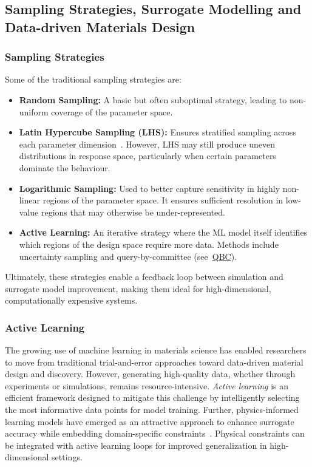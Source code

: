 \documentclass[class=scrbook, crop=false]{standalone}
\begin{document}
\subsection{Sampling Strategies, Surrogate Modelling and Data-driven Materials Design}

\subsubsection{Sampling Strategies}
\label{Subsubsection::Sampling_strategies}

Some of the traditional sampling strategies are:

\begin{itemize}
	\item \textbf{Random Sampling:} A basic but often suboptimal strategy, leading to non-uniform coverage of the parameter space. 
	
	\item \textbf{Latin Hypercube Sampling (LHS):} Ensures stratified sampling across each parameter dimension~\cite{mckay1979lhs}. However, LHS may still produce uneven distributions in response space, particularly when certain parameters dominate the behaviour.
	
	\item \textbf{Logarithmic Sampling:} Used to better capture sensitivity in highly non-linear regions of the parameter space. It ensures sufficient resolution in low-value regions that may otherwise be under-represented.
	
	\item \textbf{Active Learning:} An iterative strategy where the ML model itself identifies which regions of the design space require more data. Methods include uncertainty sampling and query-by-committee (see~\hyperlink{QBC}{QBC}).
\end{itemize}

Ultimately, these strategies enable a feedback loop between simulation and surrogate model improvement, making them ideal for high-dimensional, computationally expensive systems.


\subsubsection{Active Learning}

The growing use of machine learning in materials science has enabled researchers to move from traditional trial-and-error approaches toward data-driven material design and discovery. However, generating high-quality data, whether through experiments or simulations, remains resource-intensive. \textit{Active learning} is an efficient framework designed to mitigate this challenge by intelligently selecting the most informative data points for model training. Further, physics-informed learning models have emerged as an attractive approach to enhance surrogate accuracy while embedding domain-specific constraints~\cite{zhu2019physics, karniadakis2021pinns}. Physical constraints can be integrated with active learning loops for improved generalization in high-dimensional settings.
\end{document}
